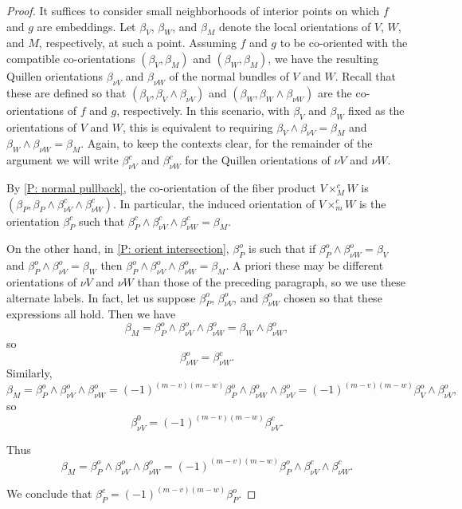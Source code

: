 \begin{proof}
	It suffices to consider small neighborhoods of interior points on which $f$ and $g$ are embeddings.
	Let $\beta_V$, $\beta_W$, and $\beta_M$ denote the local orientations of $V$, $W$, and $M$, respectively, at such a point.
	Assuming $f$ and $g$ to be co-oriented with the compatible co-orientations $(\beta_V,\beta_M)$ and $(\beta_W,\beta_M)$, we have the resulting Quillen orientations $\beta_{\nu V}$ and $\beta_{\nu W}$ of the normal bundles of $V$ and $W$.
	Recall that these are defined so that $(\beta_V,\beta_V \wedge \beta_{\nu V})$ and $(\beta_W,\beta_W \wedge \beta_{\nu W})$ are the co-orientations of $f$ and $g$, respectively.
	In this scenario, with $\beta_V$ and $\beta_W$ fixed as the orientations of $V$ and $W$, this is equivalent to requiring $\beta_V \wedge \beta_{\nu V} = \beta_M$ and $\beta_W \wedge \beta_{\nu W} = \beta_M$.
	Again, to keep the contexts clear, for the remainder of the argument we will write $\beta^c_{\nu V}$ and $\beta^c_{\nu W}$ for the Quillen orientations of $\nu V$ and $\nu W$.

	By \cref{P: normal pullback}, the co-orientation of the fiber product $V \times_M^c W$ is $(\beta_P,\beta_P \wedge \beta^c_{\nu V} \wedge \beta^c_{\nu W})$.
	In particular, the induced orientation of $V\times_m^c W$ is the orientation $\beta_P^c$ such that $\beta_P^c \wedge \beta^c_{\nu V} \wedge \beta^c_{\nu W} = \beta_M$.

	On the other hand, in \cref{P: orient intersection}, $\beta^o_P$ is such that if $\beta^o_P \wedge \beta^o_{\nu W} = \beta_V$ and $\beta^o_P \wedge \beta^o_{\nu V} = \beta_W$ then $\beta^o_P \wedge \beta^o_{\nu V} \wedge \beta^o_{\nu W} = \beta_M.$ A priori these may be different orientations of $\nu V$ and $\nu W$ than those of the preceding paragraph, so we use these alternate labels.
	In fact, let us suppose $\beta^o_P$, $\beta^o_{\nu V}$, and $\beta^o_{\nu W}$ chosen so that these expressions all hold.
	Then we have
	$$\beta_M = \beta^o_P \wedge \beta^o_{\nu V} \wedge \beta^o_{\nu W} = \beta_{W} \wedge \beta^o_{\nu W},$$
	so
	$$\beta_{\nu W}^o = \beta_{\nu W}^c.$$
	Similarly,
	$$\beta_M = \beta^o_P \wedge \beta^o_{\nu V} \wedge \beta^o_{\nu W} = (-1)^{(m-v)(m-w)}\beta^o_P \wedge \beta^o_{\nu W} \wedge \beta^o_{\nu V} = (-1)^{(m-v)(m-w)}\beta^o_V \wedge \beta^o_{\nu V},$$
	so
	$$\beta^0_{\nu V} = (-1)^{(m-v)(m-w)}\beta^c_{\nu V}.$$

	Thus
	$$\beta_M = \beta^o_P \wedge \beta^o_{\nu V} \wedge \beta^o_{\nu W} = (-1)^{(m-v)(m-w)}\beta^o_P \wedge \beta^c_{\nu V} \wedge \beta^c_{\nu W}.$$

	We conclude that $\beta^c_P = (-1)^{(m-v)(m-w)}\beta^o_P$.
\end{proof}


